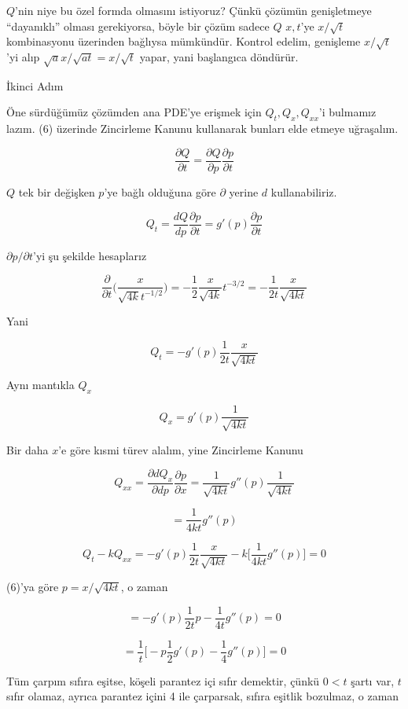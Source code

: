 \documentclass[12pt,fleqn]{article}\usepackage{../../common}
\begin{document}
$Q$'nin niye bu özel formda olmasını istiyoruz? Çünkü çözümün genişletmeye
``dayanıklı'' olması gerekiyorsa, böyle bir çözüm sadece $Q$ $x,t$'ye
$x/\sqrt{t}$ kombinasyonu üzerinden bağlıysa mümkündür. Kontrol edelim,
genişleme $x/\sqrt{t}$'yi alıp $\sqrt{a}x/\sqrt{at} = x/\sqrt{t}$ yapar,
yani başlangıca döndürür. 

İkinci Adım

Öne sürdüğümüz çözümden ana PDE'ye erişmek için $Q_t,Q_{x},Q_{xx}$'i
bulmamız lazım. (6) üzerinde Zincirleme Kanunu kullanarak bunları elde
etmeye uğraşalım. 

$$ \frac{\partial Q}{\partial t} = 
\frac{\partial Q}{\partial p}\frac{\partial p}{\partial t}
$$

$Q$ tek bir değişken $p$'ye bağlı olduğuna göre $\partial$ yerine $d$
kullanabiliriz. 

$$ Q_t = 
\frac{dQ}{dp}\frac{\partial p}{\partial t}  = 
g'(p)\frac{\partial p}{\partial t} 
$$

$\partial p/\partial t$'yi şu şekilde hesaplarız

$$ 
\frac{\partial }{\partial t}
\bigg( 
\frac{x}{\sqrt{4k} t ^{-1/2}}
\bigg) = 
-\frac{1}{2} \frac{x}{\sqrt{4k}} t ^{-3/2} = 
-\frac{1}{2t} \frac{x}{\sqrt{4kt}}
 $$

Yani 

$$ Q_t = 
- g'(p)\frac{1}{2t} \frac{x}{\sqrt{4kt}}
$$

Aynı mantıkla $Q_x$

$$ Q_x = g'(p)\frac{1}{\sqrt{4kt}} $$

Bir daha $x$'e göre kısmi türev alalım, yine Zincirleme Kanunu 

$$ Q_{xx} = \frac{\partial dQ_x}{\partial dp}
\frac{\partial p}{\partial x} = 
\frac{1}{\sqrt{4kt}}g''(p)\frac{1}{\sqrt{4kt}} 
 $$

$$ = \frac{1}{4kt}g''(p) $$

$$ Q_t - kQ_{xx} = 
- g'(p)\frac{1}{2t} \frac{x}{\sqrt{4kt}} -
k\bigg[ 
 \frac{1}{4kt}g''(p) 
\bigg] = 0
 $$

(6)'ya göre $p = x/\sqrt{4kt}$, o zaman 

$$ =
- g'(p)\frac{1}{2t} p - \frac{1}{4t}g''(p)  = 0
 $$

$$ = \frac{1}{t} \bigg[
-p\frac{1}{2}g'(p) - \frac{1}{4}g''(p)
\bigg] = 0
 $$

Tüm çarpım sıfıra eşitse, köşeli parantez içi sıfır demektir, çünkü $0 < t$
şartı var, $t$ sıfır olamaz, ayrıca parantez içini 4 ile çarparsak, sıfıra
eşitlik bozulmaz, o zaman 
\end{document}
